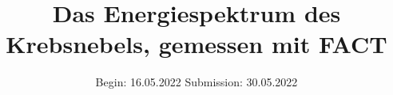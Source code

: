 


\title{Das Energiespektrum des Krebsnebels, gemessen mit FACT}
\date{%
  Begin: 16.05.2022
  \hspace{3em}
  Submission:  30.05.2022
}



\maketitle
\thispagestyle{empty}
\tableofcontents
\newpage






\printbibliography{}


